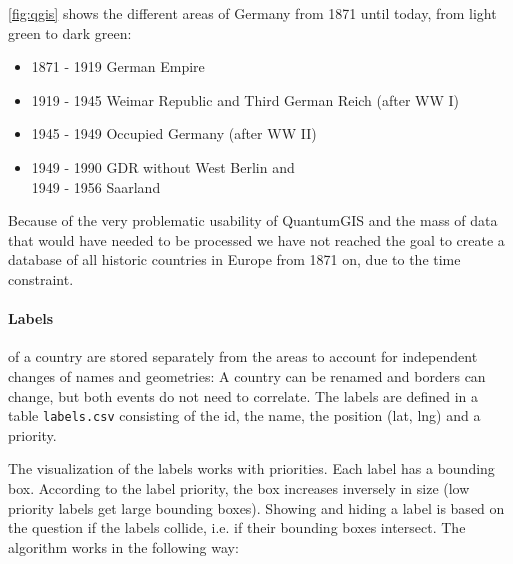\ref{fig:qgis} shows the different areas of Germany from 1871 until today, from light green to dark green:

\begin{itemize}
  \item 1871 - 1919 German Empire
  \item 1919 - 1945 Weimar Republic and Third German Reich (after WW I)
  \item 1945 - 1949 Occupied Germany (after WW II)
  \item 1949 - 1990 GDR without West Berlin and \\
        1949 - 1956 Saarland
\end{itemize}

Because of the very problematic usability of QuantumGIS and the mass of data that would have needed to be processed we have not reached the goal to create a database of all historic countries in Europe from 1871 on, due to the time constraint.

\paragraph{Labels} of a country are stored separately from the areas to account for independent changes of names and geometries: A country can be renamed and borders can change, but both events do not need to correlate. The labels are defined in a table \texttt{labels.csv} consisting of the id, the name, the position (lat, lng) and a priority.

\newpage
The visualization of the labels works with priorities. Each label has a bounding box. According to the label priority, the box increases inversely in size (low priority labels get large bounding boxes). Showing and hiding a label is based on the question if the labels collide, i.e. if their bounding boxes intersect. The algorithm works in the following way:

